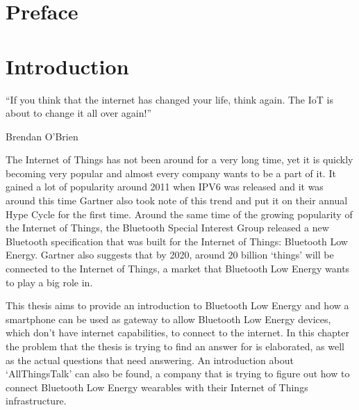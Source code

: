 \documentclass[pdftex,a4paper,12pt,twoside]{report}
\begin{document}
\begin{abstract}
\end{abstract}

\chapter*{Preface}
\label{ch:preface}


\tableofcontents



\chapter{Introduction}
\label{ch:introduction}
\epigraph{``If you think that the internet has changed your life, think again. The IoT is about to change it all over again!''}{Brendan O'Brien}
The Internet of Things has not been around for a very long time, yet it is quickly becoming very popular and almost every company wants to be a part of it. It gained a lot of popularity around 2011 when IPV6 was released and it was around this time Gartner \citep{gartner2012} also took note of this trend and put it on their annual Hype Cycle for the first time. Around the same time of the growing popularity of the Internet of Things, the Bluetooth Special Interest Group released a new Bluetooth specification that was built for the Internet of Things: Bluetooth Low Energy. Gartner \citep{gartner2015} also suggests that by 2020, around 20 billion `things' will be connected to the Internet of Things, a market that Bluetooth Low Energy wants to play a big role in.

This thesis aims to provide an introduction to Bluetooth Low Energy and how a smartphone can be used as gateway to allow Bluetooth Low Energy devices, which don't have internet capabilities, to connect to the internet. In this chapter the problem that the thesis is trying to find an answer for is elaborated, as well as the actual questions that need answering. An introduction about `AllThingsTalk' can also be found, a company that is trying to figure out how to connect Bluetooth Low Energy wearables with their Internet of Things infrastructure.
\end{document}
